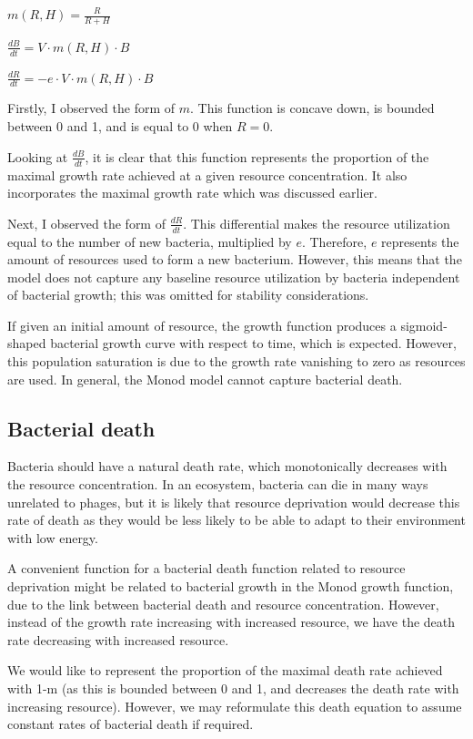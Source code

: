 \documentclass{article}
\begin{document}
\begin{center} $
m(R, H) = \frac{R}{R+H}$

$
\frac{dB}{dt} = V \cdot m(R, H) \cdot B$

$\frac{dR}{dt} = -e \cdot V \cdot m(R, H) \cdot B $
\end{center}

Firstly, I observed the form of $m$. This function is concave down, is bounded between 0 and 1, and is equal to 0 when $R=0$. 

Looking at $\frac{dB}{dt}$, it is clear that this function represents the proportion of the maximal growth rate achieved at a given resource concentration. It also incorporates the maximal growth rate which was discussed earlier. 

Next, I observed the form of $\frac{dR}{dt}$. This differential makes the resource utilization equal to the number of new bacteria, multiplied by $e$. Therefore, $e$ represents the amount of resources used to form a new bacterium. However, this means that the model does not capture any baseline resource utilization by bacteria independent of bacterial growth; this was omitted for stability considerations.
 
If given an initial amount of resource, the growth function produces a sigmoid-shaped bacterial growth curve with respect to time, which is expected. However, this population saturation is due to the growth rate vanishing to zero as resources are used. In general, the Monod model cannot capture bacterial death.

\subsection{Bacterial death}
Bacteria should have a natural death rate, which monotonically decreases with the resource concentration. In an ecosystem, bacteria can die in many ways unrelated to phages, but it is likely that resource deprivation would decrease this rate of death as they would be less likely to be able to adapt to their environment with low energy. 

A convenient function for a bacterial death function related to resource deprivation might be related to bacterial growth in the Monod growth function, due to the link between bacterial death and resource concentration. However, instead of the growth rate increasing with increased resource, we have the death rate decreasing with increased resource.

We would like to represent the proportion of the maximal death rate achieved with 1-m (as this is bounded between 0 and 1, and decreases the death rate with increasing resource). However, we may reformulate this death equation to assume constant rates of bacterial death if required.
\end{document}

